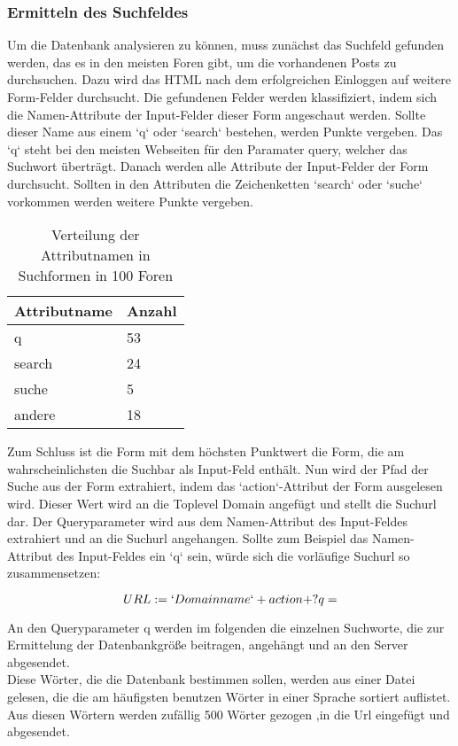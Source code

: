 \subsubsection{Ermitteln des Suchfeldes}
Um die Datenbank analysieren zu können, muss zunächst das Suchfeld gefunden werden, das es in den meisten Foren gibt, um die vorhandenen Posts zu durchsuchen.
Dazu wird das HTML nach dem erfolgreichen Einloggen auf weitere Form-Felder durchsucht. Die gefundenen Felder werden klassifiziert, indem sich die Namen-Attribute der Input-Felder dieser Form angeschaut werden. Sollte dieser Name aus einem `q` oder `search` bestehen, werden Punkte vergeben. Das `q` steht bei den meisten Webseiten für den Paramater query, welcher das Suchwort überträgt.
Danach werden alle Attribute der Input-Felder der Form durchsucht. Sollten in den Attributen die Zeichenketten `search` oder `suche` vorkommen werden weitere Punkte vergeben.

\begin{table}[h!]
\centering 
\begin{tabular}{ | p{3cm} | p{3cm}|} \hline
Attributname & Anzahl \\ \hline
q & 53 \\ \hline
search & 24 \\ \hline
suche & 5 \\ \hline
andere & 18 \\ \hline
\end{tabular}
\caption{Verteilung der Attributnamen in Suchformen in 100 Foren}
\end{table}

Zum Schluss ist die Form mit dem höchsten Punktwert die Form, die am wahrscheinlichsten die Suchbar als Input-Feld enthält.
Nun wird der Pfad der Suche aus der Form extrahiert, indem das `action`-Attribut der Form ausgelesen wird. Dieser Wert wird an die Toplevel Domain angefügt und stellt die Suchurl dar. Der Queryparameter wird aus dem Namen-Attribut des Input-Feldes extrahiert und an die Suchurl angehangen. Sollte zum Beispiel das Namen-Attribut des Input-Feldes ein `q` sein, würde sich die vorläufige Suchurl so zusammensetzen:

\[ URL := `Domainname` + action + ?q= \]

An den Queryparameter q werden im folgenden die einzelnen Suchworte, die zur Ermittelung der Datenbankgröße beitragen, angehängt und an den Server abgesendet.\\
Diese Wörter, die die Datenbank bestimmen sollen, werden aus einer Datei gelesen, die die am häufigsten benutzen Wörter in einer Sprache sortiert auflistet. Aus diesen Wörtern werden zufällig 500 Wörter gezogen ,in die Url eingefügt und abgesendet.

